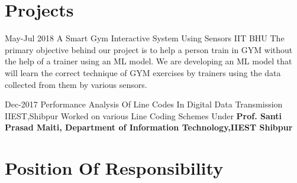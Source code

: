 \documentclass[]{cv-style}          %
\begin{document}

\section{ Projects}

\begin{entrylist}
\entry
{May-Jul 2018}
{A Smart Gym Interactive System Using Sensors }
{IIT BHU}
{The primary objective behind our project is to help a person train in GYM without the help of a trainer using an ML model. We are developing an ML model that will learn the correct technique of GYM exercises by trainers using the data collected from them by various sensors.}
{\vspace{-0.3cm}}
\end{entrylist}

\begin{entrylist}
\entry
{Dec-2017}
{Performance Analysis Of Line Codes In Digital Data Transmission}
{IIEST,Shibpur}
{Worked on various Line Coding Schemes Under \textbf{Prof. Santi Prasad Maiti, Department of Information Technology,IIEST Shibpur} }
{\vspace{-0.3cm}}
\end{entrylist}




\section{Position Of Responsibility}
\end{document}
